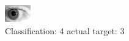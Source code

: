 \begin{figure}[h!]
\begin{center}
\includegraphics[width=0.60\columnwidth]{figures/ID301_class_4_target_3.png}
\end{center}
\caption{ Classification: 4 actual target: 3}
\label{fig:ID301_class_4_target_3}
\end{figure}
